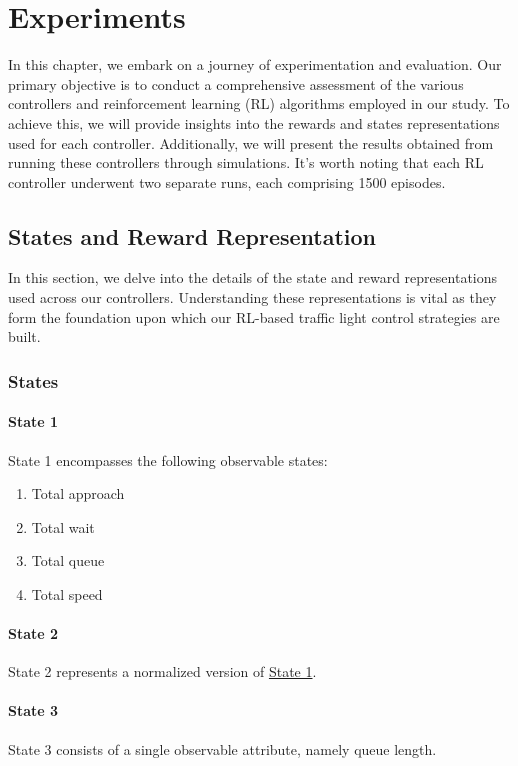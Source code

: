 \chapter{Experiments}
In this chapter, we embark on a journey of experimentation and evaluation. Our primary objective is to conduct a comprehensive assessment of the various controllers and reinforcement learning (RL) algorithms employed in our study. To achieve this, we will provide insights into the rewards and states representations used for each controller. Additionally, we will present the results obtained from running these controllers through simulations. It's worth noting that each RL controller underwent two separate runs, each comprising 1500 episodes.

\section{States and Reward Representation}
In this section, we delve into the details of the state and reward representations used across our controllers. Understanding these representations is vital as they form the foundation upon which our RL-based traffic light control strategies are built.

\subsection{States}
\subsubsection{State 1} \label{subsec:state-1}
State 1 encompasses the following observable states:

\begin{enumerate}
    \item Total approach
    \item Total wait
    \item Total queue
    \item Total speed
\end{enumerate}

\subsubsection{State 2} \label{subsec:state-2}
State 2 represents a normalized version of \hyperref[subsec:state-1]{State 1}.

\subsubsection{State 3} \label{subsec:state-3}
State 3 consists of a single observable attribute, namely queue length.

